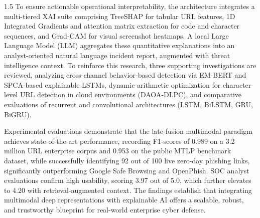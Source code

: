 \begin{spacing}{1.5}
To ensure actionable operational interpretability, the architecture integrates a multi-tiered XAI suite comprising TreeSHAP for tabular URL features, 1D Integrated Gradients and attention matrix extraction for code and character sequences, and Grad-CAM for visual screenshot heatmaps. A local Large Language Model (LLM) aggregates these quantitative explanations into an analyst-oriented natural language incident report, augmented with threat intelligence context. To reinforce this research, three supporting investigations are reviewed, analyzing cross-channel behavior-based detection via EM-BERT and SPCA-based explainable LSTMs, dynamic arithmetic optimization for character-level URL detection in cloud environments (DAOA-DLPC), and comparative evaluations of recurrent and convolutional architectures (LSTM, BiLSTM, GRU, BiGRU).

Experimental evaluations demonstrate that the late-fusion multimodal paradigm achieves state-of-the-art performance, recording F1-scores of 0.989 on a 3.2 million URL enterprise corpus and 0.953 on the public MTLP benchmark dataset, while successfully identifying 92 out of 100 live zero-day phishing links, significantly outperforming Google Safe Browsing and OpenPhish. SOC analyst evaluations confirm high usability, scoring 3.97 out of 5.0, which further elevates to 4.20 with retrieval-augmented context. The findings establish that integrating multimodal deep representations with explainable AI offers a scalable, robust, and trustworthy blueprint for real-world enterprise cyber defense.
\end{spacing}
